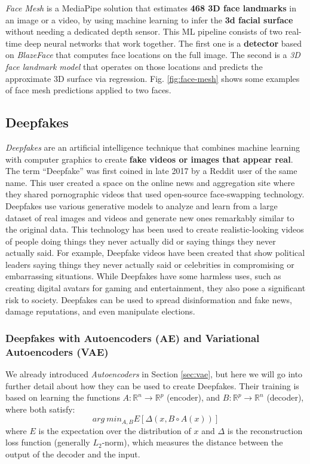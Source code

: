 \documentclass[preprint]{elsarticle}
\begin{document}
\emph{Face Mesh} is a MediaPipe solution that estimates \textbf{468 3D face landmarks} in an image or a video,
by using machine learning to infer the \textbf{3d facial surface} without needing a dedicated depth sensor.
This ML pipeline consists of two real-time deep neural networks that work together.
The first one is a \textbf{detector} based on \emph{BlazeFace} that computes face locations on the full image.
The second is a \emph{3D face landmark model} \cite{kartynnik2019realtime} that operates on those locations and predicts the 
approximate 3D surface via regression. Fig. \ref{fig:face-mesh} shows some examples of face mesh predictions applied to two faces.


\subsection{Deepfakes}
\emph{Deepfakes} are an artificial intelligence technique that combines machine learning with computer graphics to create \textbf{fake videos or images that appear real}. 
The term “Deepfake” was first coined in late 2017 by a Reddit user of the same name. 
This user created a space on the online news and aggregation site where they shared pornographic videos that used open-source face-swapping technology.
Deepfakes use various generative models to analyze and learn from a large dataset of real images and videos and generate new ones remarkably similar to the original data.
This technology has been used to create realistic-looking videos of people doing things they never actually did or saying things they never actually said. 
For example, Deepfake videos have been created that show political leaders saying things they never actually said or celebrities in compromising or embarrassing situations.
While Deepfakes have some harmless uses, such as creating digital avatars for gaming and entertainment, they also pose a significant risk to society. 
Deepfakes can be used to spread disinformation and fake news, damage reputations, and even manipulate elections.

\subsubsection{Deepfakes with Autoencoders (AE) and Variational Autoencoders (VAE)} \label{sec:deep-vae}
We already introduced \emph{Autoencoders} \cite{bank2021autoencoders} in Section \ref{sec:vae}, 
but here we will go into further detail 
about how they can be used to create Deepfakes.
Their training is based on learning the functions $A : \mathbb{R}^n \rightarrow \mathbb{R}^p$ (encoder), 
and $B:\mathbb{R}^p \rightarrow \mathbb{R}^n$ (decoder), where both satisfy:
\begin{equation}
	arg~min_{A,B}E[\Delta(x,B \circ A(x))]
\end{equation}
where $E$ is the expectation over the distribution of $x$ and $\Delta$ is the reconstruction loss function (generally
$L_2$-norm), which measures the distance between the output of the decoder and the input.
\end{document}
